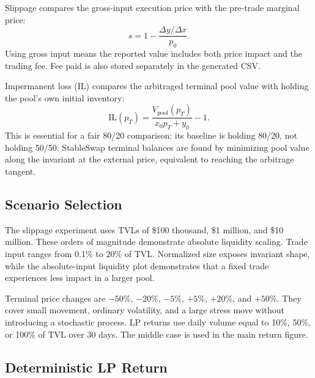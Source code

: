 \documentclass[11pt,twocolumn]{article}
\newcommand{\pct}[1]{#1\%}
\begin{document}
Slippage compares the gross-input execution price with the pre-trade marginal
price:
\begin{equation}
s=1-\frac{\Delta y/\Delta x}{p_0}.
\end{equation}
Using gross input means the reported value includes both price impact and the
trading fee. Fee paid is also stored separately in the generated CSV.

Impermanent loss (IL) compares the arbitraged terminal pool value with holding
the pool's own initial inventory:
\begin{equation}
\mathrm{IL}(p_T)=
\frac{V_{\mathrm{pool}}(p_T)}{x_0p_T+y_0}-1.
\end{equation}
This is essential for a fair 80/20 comparison: its baseline is holding 80/20,
not holding 50/50. StableSwap terminal balances are found by minimizing pool
value along the invariant at the external price, equivalent to reaching the
arbitrage tangent.

\subsection{Scenario Selection}

The slippage experiment uses TVLs of \$100 thousand, \$1 million, and \$10
million. These orders of magnitude demonstrate absolute liquidity scaling.
Trade input ranges from \pct{0.1} to \pct{20} of TVL. Normalized size exposes
invariant shape, while the absolute-input liquidity plot demonstrates that a
fixed trade experiences less impact in a larger pool.

Terminal price changes are $-\pct{50}$, $-\pct{20}$, $-\pct{5}$,
$+\pct{5}$, $+\pct{20}$, and $+\pct{50}$. They cover small movement, ordinary
volatility, and a large stress move without introducing a stochastic process.
LP returns use daily volume equal to \pct{10}, \pct{50}, or \pct{100} of TVL
over 30 days. The middle case is used in the main return figure.

\subsection{Deterministic LP Return}
\end{document}
